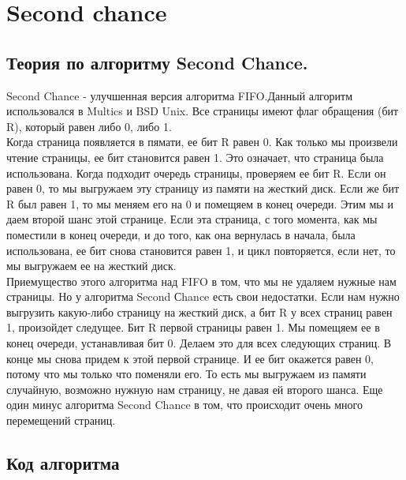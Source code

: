 \section{Second chance}

\subsection{Теория по алгоритму Second Chance.} 

Second Chance - улучшенная версия алгоритма FIFO.Данный алгоритм использовался в Multics и BSD Unix. Все страницы имеют флаг обращения (бит R), который равен либо 0, либо 1.\\
Когда страница появляется в пямати, ее бит R равен 0. Как только мы произвели чтение страницы, ее бит становится равен 1. Это означает, что страница была использована. Когда подходит очередь страницы, проверяем ее бит R. Если он равен 0, то мы выгружаем эту страницу из памяти на жесткий диск. Если же бит R был равен 1, то мы меняем его на 0 и помещяем в конец очереди. Этим мы и даем второй шанс этой странице. Если эта страница, с того момента, как мы поместили в конец очереди, и до того, как она вернулась в начала, была использована, ее бит снова становится равен 1, и цикл  повторяется, если нет, то мы выгружаем ее на жесткий диск.\\
 Приемущество этого алгоритма над FIFO в том, что мы не удаляем нужные нам страницы. Но у алгоритма Second Сhance есть свои недостатки. Если нам нужно выгрузить какую-либо страницу на жесткий диск, а бит R у всех страниц равен 1, произойдет следущее. Бит R первой страницы равен 1. Мы помещяем ее в конец очереди, устанавливая бит 0. Делаем это для всех следующих страниц. В конце мы снова придем к этой первой странице. И ее бит окажется равен 0, потому что мы только что поменяли его. То есть мы выгружаем из памяти случайную, возможно нужную нам страницу, не давая ей второго шанса. Еще один минус алгоритма Second Chance  в том, что происходит очень много перемещений страниц.
 
 \subsection{Код алгоритма}